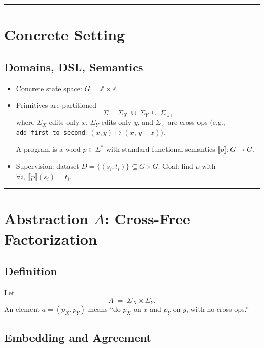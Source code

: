 \documentclass[11pt]{article}
\begin{document}
\vspace{6pt}\noindent\rule{\textwidth}{0.4pt}\vspace{6pt}

\section{Concrete Setting}

\subsection{Domains, DSL, Semantics}
\begin{itemize}
    \item Concrete state space: $G=\mathbb{Z}\times \mathbb{Z}$.
    \item Primitives are partitioned
    \begin{equation}
    \Sigma = \Sigma_X \;\cup\; \Sigma_Y \;\cup\; \Sigma_{\times},
    \end{equation}
    where $\Sigma_X$ edits only $x$, $\Sigma_Y$ edits only $y$, and $\Sigma_{\times}$ are cross-ops (e.g., \texttt{add\_first\_to\_second}: $(x,y)\mapsto(x,\,y+x)$).
    
    A program is a word $p\in\Sigma^{*}$ with standard functional semantics $\llbracket p\rrbracket:G\rightarrow G$.
    \item Supervision: dataset $D=\{(s_i,t_i)\}\subseteq G\times G$. Goal: find $p$ with $\forall i,\ \llbracket p\rrbracket(s_i)=t_i$.
\end{itemize}

\vspace{6pt}\noindent\rule{\textwidth}{0.4pt}\vspace{6pt}

\section{Abstraction $A$: Cross-Free Factorization}

\subsection{Definition}

Let
\begin{equation}
A \;=\; \Sigma_X^{}\times \Sigma_Y^{}.
\end{equation}
An element $a=(p_X,p_Y)$ means ``do $p_X$ on $x$ and $p_Y$ on $y$, with no cross-ops.''

\subsection{Embedding and Agreement}
\end{document}
